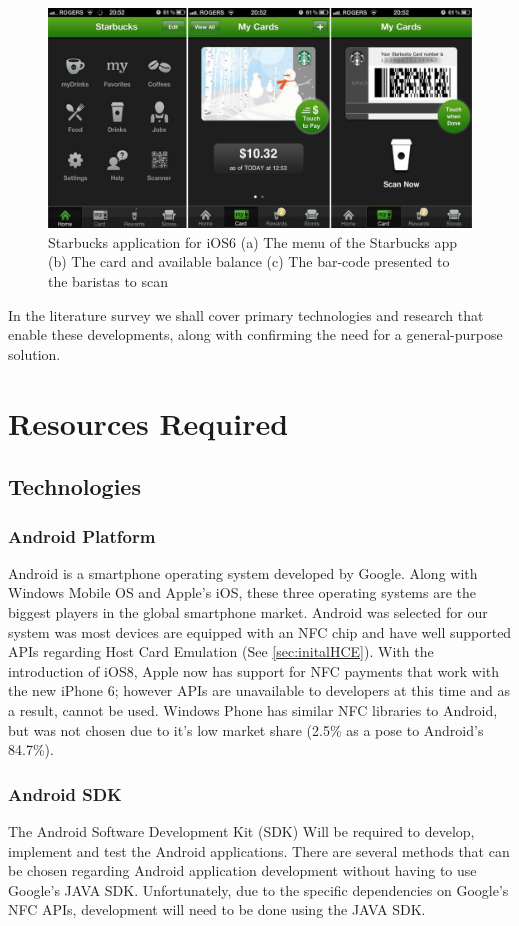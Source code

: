 \begin{figure}[h!]
  \centering
    \includegraphics[width=1\textwidth]{img/starbucks-image-2.jpeg}
      \caption{Starbucks application for iOS6 (a) The menu of the Starbucks app (b) The card and available balance (c) The bar-code presented to the baristas to scan}
      \label{fig:starbucksios6}
\end{figure}

In the literature survey we shall cover primary technologies and research that enable these developments, along with confirming the need for a general-purpose solution.

\section{Resources Required}
\subsection{Technologies}
\subsubsection{Android Platform}
Android is a smartphone operating system developed by Google. Along with Windows Mobile OS and Apple's iOS, these three operating systems are the biggest players in the global smartphone market. Android was selected for our system was most devices are equipped with an NFC chip and have well supported APIs regarding Host Card Emulation (See \ref{sec:initalHCE}). With the introduction of iOS8, Apple now has support for NFC payments that work with the new iPhone 6; however APIs are unavailable to developers at this time and as a result, cannot be used. Windows Phone has similar NFC libraries to Android, but was not chosen due to it's low market share (2.5\% as a pose to Android's 84.7\%)\cite{marketShare}. 
\subsubsection{Android SDK}
The Android Software Development Kit (SDK) Will be required to develop, implement and test the Android applications. There are several methods that can be chosen regarding Android application development without having to use Google's JAVA SDK. Unfortunately, due to the specific dependencies on Google's NFC APIs, development will need to be done using the JAVA SDK.
